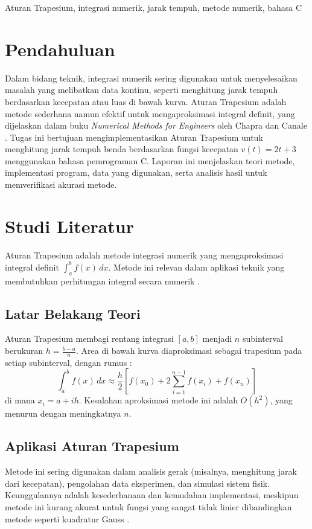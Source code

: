 \documentclass[conference]{IEEEtran}
\begin{document}
\begin{IEEEkeywords}
Aturan Trapesium, integrasi numerik, jarak tempuh, metode numerik, bahasa C
\end{IEEEkeywords}

\section{Pendahuluan}
Dalam bidang teknik, integrasi numerik sering digunakan untuk menyelesaikan masalah yang melibatkan data kontinu, seperti menghitung jarak tempuh berdasarkan kecepatan atau luas di bawah kurva. Aturan Trapesium adalah metode sederhana namun efektif untuk mengaproksimasi integral definit, yang dijelaskan dalam buku \textit{Numerical Methods for Engineers} oleh Chapra dan Canale \cite{b1}. Tugas ini bertujuan mengimplementasikan Aturan Trapesium untuk menghitung jarak tempuh benda berdasarkan fungsi kecepatan \( v(t) = 2t + 3 \) menggunakan bahasa pemrograman C. Laporan ini menjelaskan teori metode, implementasi program, data yang digunakan, serta analisis hasil untuk memverifikasi akurasi metode.

\section{Studi Literatur}
Aturan Trapesium adalah metode integrasi numerik yang mengaproksimasi integral definit \( \int_a^b f(x) \, dx \). Metode ini relevan dalam aplikasi teknik yang membutuhkan perhitungan integral secara numerik \cite{b1}.

\subsection{Latar Belakang Teori}
Aturan Trapesium membagi rentang integrasi \([a, b]\) menjadi \( n \) subinterval berukuran \( h = \frac{b-a}{n} \). Area di bawah kurva diaproksimasi sebagai trapesium pada setiap subinterval, dengan rumus \cite{b1}:
\begin{equation}
\int_a^b f(x) \, dx \approx \frac{h}{2} \left[ f(x_0) + 2 \sum_{i=1}^{n-1} f(x_i) + f(x_n) \right]
\label{eq:trapezoidal}
\end{equation}
di mana \( x_i = a + i h \). Kesalahan aproksimasi metode ini adalah \( O(h^2) \), yang menurun dengan meningkatnya \( n \).

\subsection{Aplikasi Aturan Trapesium}
Metode ini sering digunakan dalam analisis gerak (misalnya, menghitung jarak dari kecepatan), pengolahan data eksperimen, dan simulasi sistem fisik. Keunggulannya adalah kesederhanaan dan kemudahan implementasi, meskipun metode ini kurang akurat untuk fungsi yang sangat tidak linier dibandingkan metode seperti kuadratur Gauss \cite{b1}.
\end{document}
